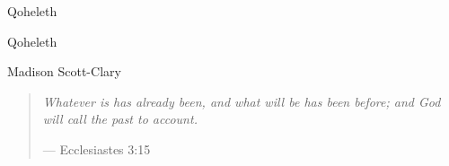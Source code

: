 \documentclass[11pt]{memoir}
\begin{document}
  \frontmatter

\thispagestyle{empty}
\null
\vfill
\begin{flushright}
  \DisplayFont Qoheleth
\end{flushright}
\vfill
\cleardoublepage

  \pagestyle{plain}

  \doublespacing

  \begin{flushright}
    \null
    \vfill
    {\Huge\DisplayFont Qoheleth}

    \vfill

    {\Large\DisplayFont Madison Scott-Clary}
  \end{flushright}
  \thispagestyle{empty}

  \newpage

  

  \null

  \cleardoublepage

  \onehalfspacing


  \mainmatter

  \pagestyle{ourbook}

  \cleardoublepage
  \null
  \thispagestyle{empty}
  \vfill
  \begin{quote}
    \emph{Whatever is has already been, and what will be has been \mbox{before;} and God will call the past to account.}

    --- Ecclesiastes 3:15
  \end{quote}
  \vfill
  
  
  
  

  \backmatter

  \markboth{}{}


  
\end{document}
